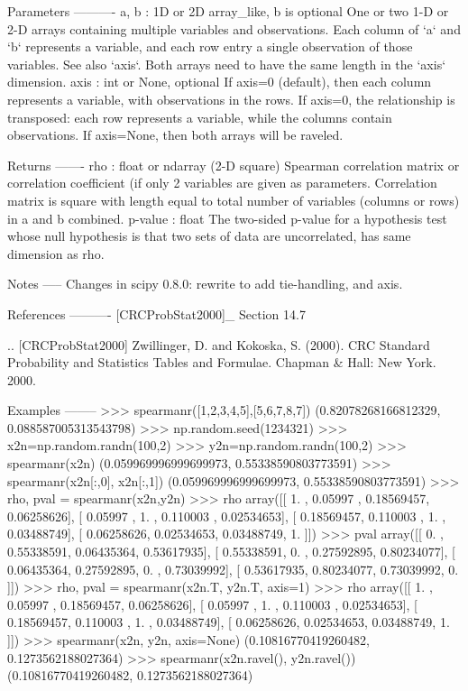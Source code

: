 \begin{DoxyVerb}
\begin{DoxyVerb}
Parameters
----------
a, b : 1D or 2D array_like, b is optional
    One or two 1-D or 2-D arrays containing multiple variables and
    observations. Each column of `a` and `b` represents a variable, and
    each row entry a single observation of those variables. See also
    `axis`. Both arrays need to have the same length in the `axis`
    dimension.
axis : int or None, optional
    If axis=0 (default), then each column represents a variable, with
    observations in the rows. If axis=0, the relationship is transposed:
    each row represents a variable, while the columns contain observations.
    If axis=None, then both arrays will be raveled.

Returns
-------
rho : float or ndarray (2-D square)
    Spearman correlation matrix or correlation coefficient (if only 2
    variables are given as parameters. Correlation matrix is square with
    length equal to total number of variables (columns or rows) in a and b
    combined.
p-value : float
    The two-sided p-value for a hypothesis test whose null hypothesis is
    that two sets of data are uncorrelated, has same dimension as rho.

Notes
-----
Changes in scipy 0.8.0: rewrite to add tie-handling, and axis.

References
----------
[CRCProbStat2000]_ Section  14.7

.. [CRCProbStat2000] Zwillinger, D. and Kokoska, S. (2000). CRC Standard
   Probability and Statistics Tables and Formulae. Chapman & Hall: New
   York. 2000.

Examples
--------
>>> spearmanr([1,2,3,4,5],[5,6,7,8,7])
(0.82078268166812329, 0.088587005313543798)
>>> np.random.seed(1234321)
>>> x2n=np.random.randn(100,2)
>>> y2n=np.random.randn(100,2)
>>> spearmanr(x2n)
(0.059969996999699973, 0.55338590803773591)
>>> spearmanr(x2n[:,0], x2n[:,1])
(0.059969996999699973, 0.55338590803773591)
>>> rho, pval = spearmanr(x2n,y2n)
>>> rho
array([[ 1.        ,  0.05997   ,  0.18569457,  0.06258626],
       [ 0.05997   ,  1.        ,  0.110003  ,  0.02534653],
       [ 0.18569457,  0.110003  ,  1.        ,  0.03488749],
       [ 0.06258626,  0.02534653,  0.03488749,  1.        ]])
>>> pval
array([[ 0.        ,  0.55338591,  0.06435364,  0.53617935],
       [ 0.55338591,  0.        ,  0.27592895,  0.80234077],
       [ 0.06435364,  0.27592895,  0.        ,  0.73039992],
       [ 0.53617935,  0.80234077,  0.73039992,  0.        ]])
>>> rho, pval = spearmanr(x2n.T, y2n.T, axis=1)
>>> rho
array([[ 1.        ,  0.05997   ,  0.18569457,  0.06258626],
       [ 0.05997   ,  1.        ,  0.110003  ,  0.02534653],
       [ 0.18569457,  0.110003  ,  1.        ,  0.03488749],
       [ 0.06258626,  0.02534653,  0.03488749,  1.        ]])
>>> spearmanr(x2n, y2n, axis=None)
(0.10816770419260482, 0.1273562188027364)
>>> spearmanr(x2n.ravel(), y2n.ravel())
(0.10816770419260482, 0.1273562188027364)


\end{DoxyVerb}
\end{DoxyVerb}
